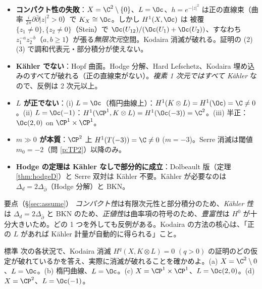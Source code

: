 \begin{ex}[反例ギャラリー]\label{ex:gallery}
\begin{itemize}
\item \textbf{コンパクト性の失敗}：$X=\C^2\setminus\{0\}$、$L=\Oc$、$h=e^{-|z|^2}$ は正の直線束（曲率 $\frac i{2\pi}\partial\bar\partial|z|^2>0$）で $K_X\cong\Oc$。しかし $H^1(X,\Oc)$ は \Cech{} 被覆 $\{z_1\neq0\},\{z_2\ne0\}$（Stein）で $\Oc(U_{12})/(\Oc(U_1)+\Oc(U_2))$、すなわち $z_1^{-a}z_2^{-b}$（$a,b\ge1$）が張る\emph{無限次元}空間。Kodaira 消滅が破れる。証明の (2)(3) で調和代表元・部分積分が使えない。
\item \textbf{Kähler でない}：Hopf 曲面。Hodge 分解、Hard Lefschetz、Kodaira 埋め込みのすべてが破れる（正の直線束がない）。\emph{複素 1 次元ではすべて Kähler} なので、反例は 2 次元以上。
\item \textbf{$L$ が正でない}：(i) $L=\Oc$（楕円曲線上）：$H^1(K\otimes L)=H^1(\Oc)=\C\ne0$。(ii) $L=\Oc(-1)$：$H^1(\CP^1,K\otimes L)=H^1(\Oc(-3))=\C^2$。(iii) 半正：$\Oc(2,0)$ on $\CP^1\times\CP^1$。
\item \textbf{$m\gg0$ が本質}：$\CP^2$ 上 $H^1(T(-3))=\C\neq0$ ($m=-3$)。Serre 消滅は閾値 $m_0=-2$（問 \ref{p:TP2}）以降のみ。
\item \textbf{Hodge の定理は Kähler なしで部分的に成立}：Dolbeault 版（定理 \ref{thm:hodgeD}）と Serre 双対は Kähler 不要。Kähler が必要なのは $\Delta_d=2\Delta_{\bar\partial}$（Hodge 分解）と BKN。
\end{itemize}
\end{ex}

\begin{keybox}{要点（\S\ref{sec:assume}）}
\emph{コンパクト性}は有限次元性と部分積分のため、\emph{Kähler 性}は $\Delta_d=2\Delta_{\bar\partial}$ と BKN のため、\emph{正値性}は曲率項の符号のため、\emph{豊富性}は $H^0$ が十分大きいため。どの 1 つを外しても反例がある。Kodaira の方法の核心は、「正の $L$ があれば Kähler 計量が自動的に得られる」こと。
\end{keybox}

\begin{prob}{標準}\label{p:assume}
次の各状況で、Kodaira 消滅 $H^q(X,K\otimes L)=0$ $(q>0)$ の証明のどの仮定が破れているかを答え、実際に消滅が破れることを確かめよ。(a) $X=\C^2\setminus0$、$L=\Oc$。(b) 楕円曲線、$L=\Oc$。(c) $X=\CP^1\times\CP^1$、$L=\Oc(2,0)$。(d) $X=\CP^2$、$L=\Oc(-1)$。
\end{prob}

